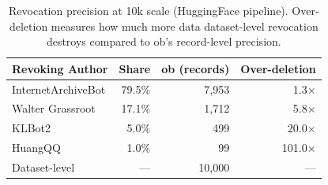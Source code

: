 \begin{table}[t]
	\centering
	\small
	\caption{Revocation precision at 10k scale (HuggingFace pipeline). Over-deletion measures how much more data dataset-level revocation destroys compared to ob's record-level precision.}
	\label{tab:revocation}
	\setlength{\tabcolsep}{4pt}
	\begin{tabular}{@{}lrrr@{}}
		\toprule
		Revoking Author    & Share  & ob (records) & Over-deletion \\
		\midrule
		InternetArchiveBot & 79.5\% & 7,953        & 1.3$\times$   \\
		Walter Grassroot   & 17.1\% & 1,712        & 5.8$\times$   \\
		KLBot2             & 5.0\%  & 499          & 20.0$\times$  \\
		HuangQQ            & 1.0\%  & 99           & 101.0$\times$ \\
		\midrule
		Dataset-level      & ---    & 10,000       & ---           \\
		\bottomrule
	\end{tabular}
\end{table}
